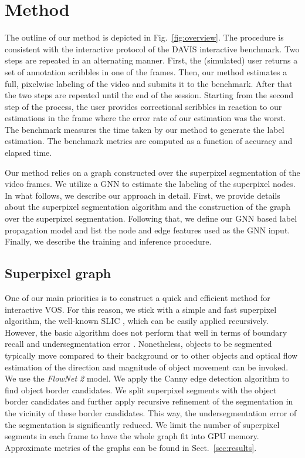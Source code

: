 \documentclass[conference]{IEEEtran}
\begin{document}
\section{Method}

The outline of our method is depicted in Fig.~\ref{fig:overview}. The procedure is consistent with the interactive protocol of the DAVIS interactive benchmark. Two steps are repeated in an alternating manner. First, the (simulated) user returns a set of annotation scribbles in one of the frames. Then, our method estimates a full, pixelwise labeling of the video and submits it to the benchmark. After that the two steps are repeated until the end of the session. Starting from the second step of the process, the user provides correctional scribbles in reaction to our estimations in the frame where the error rate of our estimation was the worst. The benchmark measures the time taken by our method to generate the label estimation. The benchmark metrics are computed as a function of accuracy and elapsed time.

Our method relies on a graph constructed over the superpixel segmentation of the video frames. We utilize a GNN to estimate the labeling of the superpixel nodes. In what follows, we describe our approach in detail. First, we provide details about the superpixel segmentation algorithm and the construction of the graph over the superpixel segmentation. Following that, we define our GNN based label propagation model and list the node and edge features used as the GNN input. Finally, we describe the training and inference procedure.

\subsection{Superpixel graph}

One of our main priorities is to construct a quick and efficient method for interactive VOS. For this reason, we stick with a simple and fast superpixel algorithm, the well-known SLIC \cite{superpixel_slic},  which can be easily applied recursively. However, the basic algorithm does not perform that well in terms of boundary recall and undersegmentation error \cite{superpixel_survey}. Nonetheless, objects to be segmented typically move compared to their background or to other objects and optical flow estimation of the direction and magnitude of object movement can be invoked. We use the \textit{FlowNet 2} \cite{flownet2} model. We apply the Canny edge detection algorithm \cite{canny} to find object border candidates. We split superpixel segments with the object border candidates and further apply recursive refinement of the segmentation in the vicinity of these border candidates. This way, the undersegmentation error of the segmentation is significantly reduced. We limit the number of superpixel segments in each frame to have the whole graph fit into GPU memory. Approximate metrics of the graphs can be found in Sect.~\ref{sec:results}.
\end{document}
